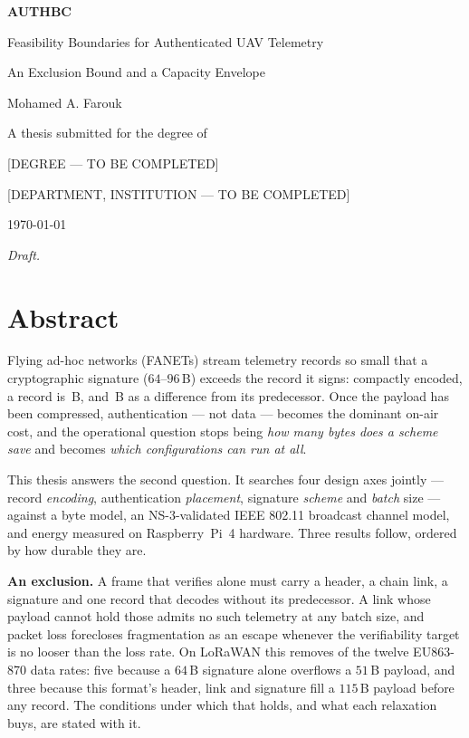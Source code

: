 \begin{titlepage}
\centering
\vspace*{2cm}
{\Huge\bfseries AUTHBC\par}
\vspace{0.6cm}
{\LARGE Feasibility Boundaries for Authenticated UAV Telemetry\par}
\vspace{0.3cm}
{\large An Exclusion Bound and a Capacity Envelope\par}
\vspace{2.5cm}
{\Large Mohamed A. Farouk\par}
\vspace{1.5cm}
{\large A thesis submitted for the degree of\par}
\vspace{0.3cm}
{\large [DEGREE --- TO BE COMPLETED]\par}
\vspace{1.5cm}
{\large [DEPARTMENT, INSTITUTION --- TO BE COMPLETED]\par}
\vspace{2cm}
{\large \today\par}
\vfill
{\small\itshape Draft.\par}
\end{titlepage}

\chapter*{Abstract}

Flying ad-hoc networks (FANETs) stream telemetry records so small that a cryptographic signature
($64$--$96$\,B) exceeds the record it signs: compactly encoded, a record is \keyLean\,B, and
\deltaLean\,B as a difference from its predecessor. Once the payload has been
compressed, authentication --- not data --- becomes the dominant on-air cost, and the operational
question stops being \emph{how many bytes does a scheme save} and becomes \emph{which
configurations can run at all}.

This thesis answers the second question. It searches four design axes jointly --- record
\emph{encoding}, authentication \emph{placement}, signature \emph{scheme} and \emph{batch} size ---
against a byte model, an NS-3-validated IEEE 802.11 broadcast channel model, and energy measured
on Raspberry~Pi~4 hardware. Three results follow, ordered by how durable they are.

\textbf{An exclusion.} A frame that verifies alone must carry a header, a chain link, a
signature and one record that decodes without its predecessor. A link whose payload cannot hold
those admits no such telemetry at any batch size, and packet loss forecloses fragmentation as an
escape whenever the verifiability target is no looser than the loss rate. On LoRaWAN this removes
\exclCount{} of the twelve EU863-870 data rates: five because a $64$\,B signature alone overflows
a $51$\,B payload, and three because this format's header, link and signature fill a $115$\,B
payload before any record. The conditions under which that holds, and what each relaxation buys, are stated with
it.

